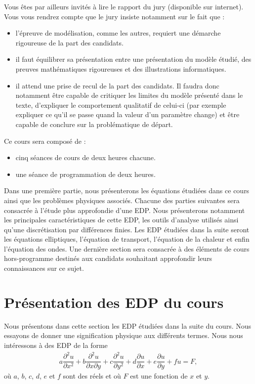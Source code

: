 \documentclass[12pt,a4paper,twoside]{article}
\begin{document}
Vous \^etes par ailleurs invit\'es \`a lire le rapport du jury (disponible sur internet).
Vous vous rendrez compte que le jury insiste notamment sur le fait que :
\begin{itemize}
\item l'\'epreuve de mod\'elisation, comme les autres, requiert une d\'emarche rigoureuse
  de la part des candidats.
\item il faut \'equilibrer sa pr\'esentation entre une pr\'esentation du mod\`ele \'etudi\'e,
  des preuves math\'ematiques rigoureuses et des illustrations informatiques.
\item il attend une prise de recul de la part des candidats.
  Il faudra donc notamment \^etre capable de critiquer les limites du mod\`ele pr\'esent\'e
  dans le texte, d'expliquer le comportement qualitatif de celui-ci 
  (par exemple expliquer ce qu'il se passe quand la valeur d'un param\`etre change)
  et \^etre capable de conclure sur la probl\'ematique de d\'epart.
\end{itemize}


Ce cours sera compos\'e de :
\begin{itemize}
\item cinq s\'eances de cours de deux heures chacune.
\item une s\'eance de programmation de deux heures.
\end{itemize}
Dans une premi\`ere partie, nous pr\'esenterons les \'equations \'etudi\'ees
dans ce cours ainsi que les probl\`emes physiques associ\'es.
Chacune des parties suivantes sera consacr\'ee \`a l'\'etude plus approfondie
d'une EDP. Nous pr\'esenterons notamment les principales caract\'eristiques de cette EDP,
les outils d'analyse utilis\'es ainsi qu'une discr\'etisation par diff\'erences finies.
Les EDP \'etudi\'ees dans la suite seront les \'equations elliptiques,
l'\'equation de transport, l'\'equation de la chaleur et enfin
l'\'equation des ondes.
Une derni\`ere section sera consacr\'ee \`a des \'el\'ements de cours
hors-programme destin\'es aux candidats souhaitant approfondir
leurs connaissances sur ce sujet.

\section{Pr\'esentation des EDP du cours}

Nous pr\'esentons dans cette section les EDP \'etudi\'ees dans la suite du cours.
Nous essayons de donner une signification physique aux diff\'erents termes.
Nous nous int\'eressons \`a des EDP de la forme
\begin{align}
  \label{eq:EDP_type}
  a \dfrac{\partial^2 u}{\partial x^2} + b \dfrac{\partial^2 u}{\partial x \partial y}
  + c \dfrac{\partial^2 u}{\partial y^2} + d \dfrac{\partial u}{\partial x}
  + e \dfrac{\partial u}{\partial y} + f u = F ,
\end{align}
o\`u $a$, $b$, $c$, $d$, $e$ et $f$ sont des r\'eels et o\`u $F$
est une fonction de $x$ et $y$.
\end{document}
